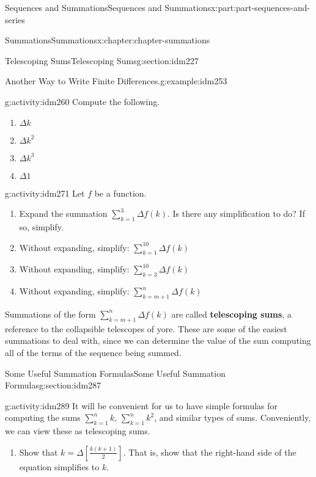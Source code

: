 \documentclass[oneside,10pt,]{book}
\newcommand{\terminology}[1]{\textbf{#1}}
\begin{document}
\begin{partptx}{Sequences and Summations}{}{Sequences and Summations}{}{}{x:part:part-sequences-and-series}
\begin{chapterptx}{Summations}{}{Summations}{}{}{x:chapter:chapter-summations}
\begin{sectionptx}{Telescoping Sums}{}{Telescoping Sums}{}{}{g:section:idm227}
\begin{example}{Another Way to Write Finite Differences.}{g:example:idm253}
\end{example}
\begin{activity}{}{g:activity:idm260}%
Compute the following.%
\begin{enumerate}[font=\bfseries,label=(\alph*),ref=\alph*]
\item{}\(\Delta k\)\item{}\(\Delta k^2\)\item{}\(\Delta k^3\)\item{}\(\Delta 1\)\end{enumerate}
\end{activity}
\begin{activity}{}{g:activity:idm271}%
Let \(f\) be a function.%
\begin{enumerate}[font=\bfseries,label=(\alph*),ref=\alph*]
\item{}Expand the summation \(\displaystyle\sum_{k = 1}^3 \Delta f(k)\). Is there any simplification to do? If so, simplify.%
\item{}Without expanding, simplify: \(\displaystyle\sum_{k = 1}^{10} \Delta f(k)\)\item{}Without expanding, simplify: \(\displaystyle\sum_{k = 3}^{10} \Delta f(k)\)\item{}Without expanding, simplify: \(\displaystyle\sum_{k = m+1}^{n} \Delta f(k)\)\end{enumerate}
\end{activity}
Summations of the form \(\displaystyle\sum_{k = m+1}^n \Delta f(k)\) are called \terminology{telescoping sums}, a reference to the collapsible telescopes of yore. These are some of the easiest summations to deal with, since we can determine the value of the sum computing all of the terms of the sequence being summed.%
\end{sectionptx}
%
%
\typeout{************************************************}
\typeout{************************************************}
%
\begin{sectionptx}{Some Useful Summation Formulas}{}{Some Useful Summation Formulas}{}{}{g:section:idm287}
\begin{activity}{}{g:activity:idm289}%
It will be convenient for us to have simple formulas for computing the sums \(\displaystyle\sum_{k=1}^n k\), \(\displaystyle\sum_{k=1}^n k^2\), and similar types of sums. Conveniently, we can view these as telescoping sums.%
\begin{enumerate}[font=\bfseries,label=(\alph*),ref=\alph*]
\item{}Show that \(k = \Delta \left[\frac{k(k+1)}{2}\right]\). That is, show that the right-hand side of the equation simplifies to \(k\).%

\end{enumerate}
\end{activity}
\end{sectionptx}
\end{chapterptx}
\end{partptx}
\end{document}
